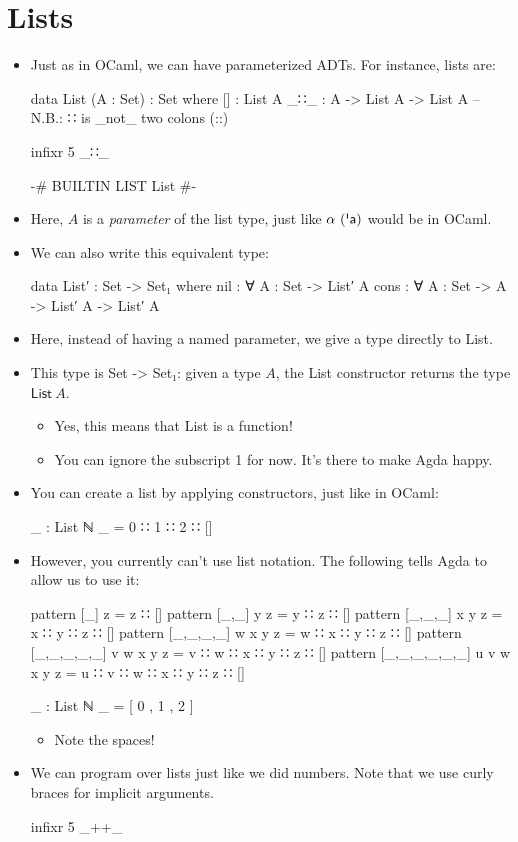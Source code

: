 \documentclass{lecturenotes}
\begin{document}
\section{Lists}
\label{sec:lists}

\begin{itemize}
\item Just as in OCaml, we can have parameterized ADTs. For instance, lists are:
\begin{code}
data List (A : Set) : Set where
  [] : List A
  _∷_ : A -> List A -> List A -- N.B.: ∷ is _not_ two colons (::)

infixr 5 _∷_

{-# BUILTIN LIST List #-}
\end{code}
\item Here, $A$ is a \emph{parameter} of the list type, just like $\alpha~(\textsf{\textquotesingle{}a})$ would be in OCaml.
\item We can also write this equivalent type:
\begin{code}
data List′ : Set -> Set₁ where
  nil : ∀ {A : Set} -> List′ A
  cons : ∀ {A : Set} -> A -> List′ A -> List′ A
\end{code}
\item Here, instead of having a named parameter, we give a type directly to \textsf{List}.
\item This type is \textsf{Set -> Set₁}: given a type $A$, the \textsf{List} constructor returns the type $\textsf{List}~A$.
  \begin{itemize}
  \item Yes, this means that \textsf{List} is a function!
  \item You can ignore the subscript \textsf{1} for now. It's there to make Agda happy.
  \end{itemize}
\item You can create a list by applying constructors, just like in OCaml:
\begin{code}
_ : List ℕ
_ = 0 ∷ 1 ∷ 2 ∷ []
\end{code}
\item However, you currently can't use list notation.
  The following tells Agda to allow us to use it:
\begin{code}
pattern [_] z = z ∷ []
pattern [_,_] y z = y ∷ z ∷ []
pattern [_,_,_] x y z = x ∷ y ∷ z ∷ []
pattern [_,_,_,_] w x y z = w ∷ x ∷ y ∷ z ∷ []
pattern [_,_,_,_,_] v w x y z = v ∷ w ∷ x ∷ y ∷ z ∷ []
pattern [_,_,_,_,_,_] u v w x y z = u ∷ v ∷ w ∷ x ∷ y ∷ z ∷ []

_ : List ℕ
_ = [ 0 , 1 , 2 ]
\end{code}
\begin{itemize}
\item Note the spaces!
\end{itemize}
\item We can program over lists just like we did numbers.
  Note that we use curly braces for implicit arguments.
\begin{code}
infixr 5 _++_


\end{code}
\end{itemize}
\end{document}
